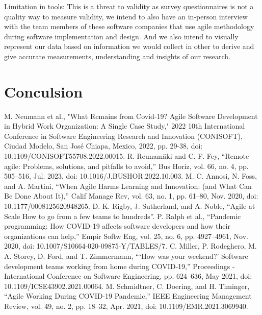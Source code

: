 \documentclass[conference]{IEEEtran}
\begin{document}
Limitation in tools: This is a threat to validity as survey questionnaires is not a quality way to measure validity, we intend to also have an in-person interview with the team members of these software companies that use agile methodology during software implementation and design. And we also intend to visually represent our data based on information we would collect in other to derive and give accurate measurements, understanding and insights of our research.

\section{Conculsion}


\begin{thebibliography}{00}
     M. Neumann et al., "What Remains from Covid-19? Agile Software Development in Hybrid Work Organization: A Single Case Study," 2022 10th International Conference in Software Engineering Research and Innovation (CONISOFT), Ciudad Modelo, San José Chiapa, Mexico, 2022, pp. 29-38, doi: 10.1109/CONISOFT55708.2022.00015.
     R. Reunamäki and C. F. Fey, “Remote agile: Problems, solutions, and pitfalls to avoid,” Bus Horiz, vol. 66, no. 4, pp. 505–516, Jul. 2023, doi: 10.1016/J.BUSHOR.2022.10.003. 
     M. C. Annosi, N. Foss, and A. Martini, “When Agile Harms Learning and Innovation: (and What Can Be Done About It),” Calif Manage Rev, vol. 63, no. 1, pp. 61–80, Nov. 2020, doi: 10.1177/0008125620948265. 
     D. K. Rigby, J. Sutherland, and A. Noble, “Agile at Scale How to go from a few teams to hundreds”.
     P. Ralph et al., “Pandemic programming: How COVID-19 affects software developers and how their organizations can help,” Empir Softw Eng, vol. 25, no. 6, pp. 4927–4961, Nov. 2020, doi: 10.1007/S10664-020-09875-Y/TABLES/7.
     C. Miller, P. Rodeghero, M. A. Storey, D. Ford, and T. Zimmermann, “‘How was your weekend?’ Software development teams working from home during COVID-19,” Proceedings - International Conference on Software Engineering, pp. 624–636, May 2021, doi: 10.1109/ICSE43902.2021.00064. 
     M. Schmidtner, C. Doering, and H. Timinger, “Agile Working During COVID-19 Pandemic,” IEEE Engineering Management Review, vol. 49, no. 2, pp. 18–32, Apr. 2021, doi: 10.1109/EMR.2021.3069940.
\end{thebibliography}
\end{document}
